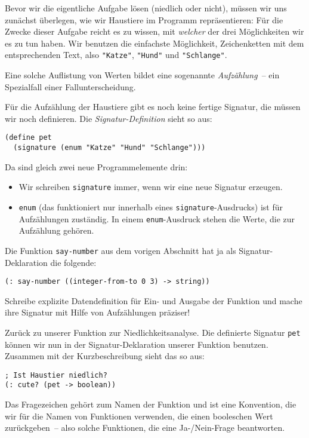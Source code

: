 Bevor wir die eigentliche Aufgabe lösen (niedlich oder nicht), müssen
wir uns zunächst überlegen, wie wir Haustiere im Programm
repräsentieren: Für die Zwecke dieser Aufgabe reicht es zu wissen, mit
\emph{welcher} der drei Möglichkeiten wir es zu tun haben.  Wir
benutzen die einfachste Möglichkeit, Zeichenketten mit dem
entsprechenden Text, also \lstinline{"Katze"}, \lstinline{"Hund"} und
\lstinline{"Schlange"}.

Eine solche Auflistung von Werten bildet eine sogenannte
\textit{Aufzählung}~-- ein Spezialfall einer
Fallunterscheidung.

Für die Aufzählung der Haustiere gibt es noch keine fertige Signatur,
die müssen wir noch definieren.  Die
\textit{Signatur-Definition} sieht so
aus:
\label{sec:pet}\label{page:signature}
%
\begin{lstlisting}
(define pet
  (signature (enum "Katze" "Hund" "Schlange")))
\end{lstlisting}
%
Da sind gleich zwei neue Programmelemente drin:
%
\begin{itemize}
\item Wir schreiben
  \lstinline{signature} immer, wenn wir eine
  neue Signatur erzeugen.
\item \lstinline{enum} (das funktioniert
  nur innerhalb eines \lstinline{signature}-Ausdrucks) ist für
  Aufzählungen zuständig.  In einem \lstinline{enum}-Ausdruck stehen
  die Werte, die zur Aufzählung gehören.
\end{itemize}
%
\begin{aufgabeinline}
  Die Funktion \lstinline{say-number} aus dem vorigen Abschnitt hat ja als
  Signatur-Deklaration die folgende:
\begin{lstlisting}
(: say-number ((integer-from-to 0 3) -> string))
\end{lstlisting}
  Schreibe explizite Datendefinition für Ein- und Ausgabe der Funktion
  und mache ihre Signatur mit Hilfe von Aufzählungen präziser!
\end{aufgabeinline}
%
Zurück zu unserer Funktion zur Niedlichkeitsanalyse.  Die definierte
Signatur \lstinline{pet} können wir nun in der Signatur-Deklaration
unserer Funktion benutzen.  Zusammen mit der Kurzbeschreibung sieht
das so aus:
%
\begin{lstlisting}
; Ist Haustier niedlich?
(: cute? (pet -> boolean))
\end{lstlisting}
%
Das Fragezeichen gehört zum Namen der Funktion und ist eine
Konvention, die wir für die Namen von Funktionen verwenden, die einen
booleschen Wert zurückgeben~-- also solche Funktionen, die eine
Ja-/Nein-Frage beantworten.

